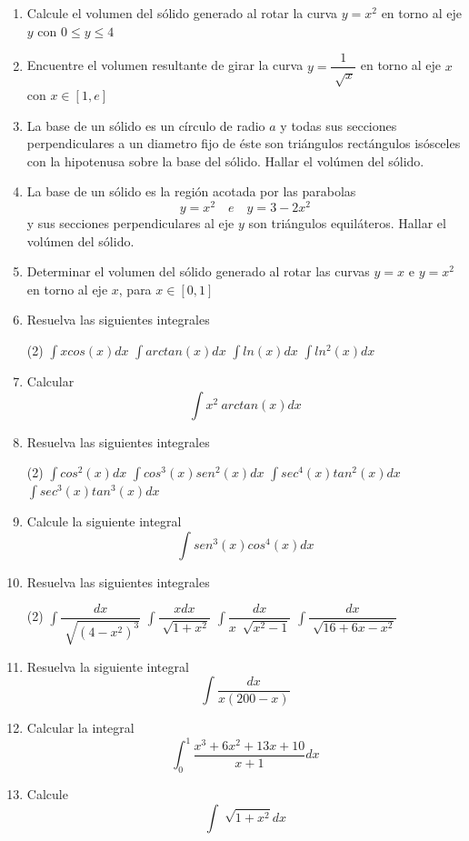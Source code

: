 \documentclass[12pt]{article}
\newenvironment{preguntas}
{\begin{enumerate}\itemsep12pt
	}
	{
	\end{enumerate}
}
\begin{document}
\begin{preguntas}
\item Calcule el volumen del sólido generado al rotar la curva $y=x^2$ en torno al eje $y$ con $0 \leq y \leq 4$
\item Encuentre el volumen resultante de girar la curva $y=\dfrac{1}{\sqrt[]{x}}$ en torno al eje $x$ con $x \in [1,e]$
\item La base de un sólido es un círculo de radio $a$ y todas sus secciones perpendiculares a un diametro fijo de éste son triángulos rectángulos isósceles con la hipotenusa sobre la base del sólido. Hallar el volúmen del sólido.
\item La base de un sólido es la región acotada por las parabolas
	$$y=x^2 \quad e \quad y = 3-2x^2$$
	y sus secciones perpendiculares al eje $y$ son triángulos equiláteros. Hallar el volúmen del sólido.
\item Determinar el volumen del sólido generado al rotar las curvas $y=x$ e $y= x^2$ en torno al eje $x$, para $x \in [0,1]$
\item Resuelva las siguientes integrales
\begin{tasks}(2)
\task $\displaystyle\int xcos(x)dx$
\task $\displaystyle\int arctan(x)dx$
\task $\displaystyle\int ln(x)dx$
\task $\displaystyle\int ln^2(x)dx$
\end{tasks}
\item Calcular
	$$\displaystyle\int x^2\ arctan(x)dx$$
\item Resuelva las siguientes integrales
\begin{tasks}(2)
\task $\displaystyle\int cos^2(x)dx$
\task $\displaystyle\int cos^3(x)sen^2(x)dx$
\task $\displaystyle\int sec^4(x)tan^2(x)dx$
\task $\displaystyle\int sec^3(x)tan^3(x)dx$
\end{tasks}
\item Calcule la siguiente integral
	$$\displaystyle\int sen^3(x)cos^4(x)dx$$
\item Resuelva las siguientes integrales
\begin{tasks}(2)
\task $\displaystyle\int \dfrac{dx}{\sqrt[]{(4-x^2)^3}}$
\task $\displaystyle\int \dfrac{xdx}{\sqrt[]{1+x^2}}$
\task $\displaystyle\int \dfrac{dx}{x\ \sqrt[]{x^2-1}}$
\task $\displaystyle\int \dfrac{dx}{\sqrt[]{16+6x-x^2}}$
\end{tasks}
\item Resuelva la siguiente integral
	$$\displaystyle\int \dfrac{dx}{x(200-x)}$$
\item Calcular la integral
	$$\displaystyle\int_0^1 \dfrac{x^3+6x^2+13x+10}{x+1}dx$$
\item Calcule
$$\displaystyle\int \sqrt[]{1+x^2}dx$$
\end{preguntas}
\end{document}
